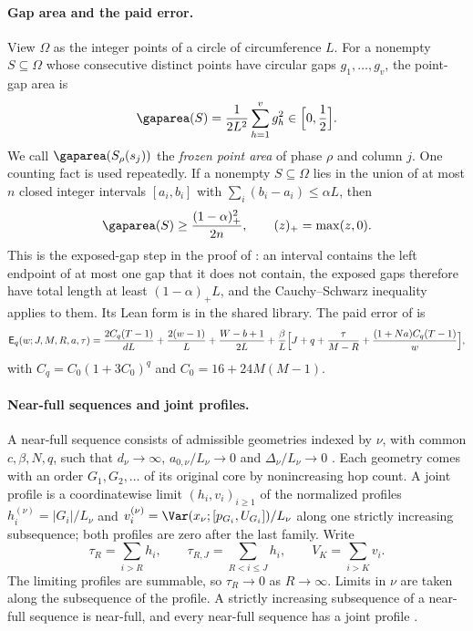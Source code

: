 \paragraph{Gap area and the paid error.}
View $\Omega$ as the integer points of a circle of circumference $L$. For a nonempty
$S\subseteq\Omega$ whose consecutive distinct points have circular gaps
$g_1,\dots,g_v$, the point-gap area is \cite[(2.14)]{SourceCovers2026}
\[
 \gaparea(S)=\frac1{2L^2}\sum_{h=1}^vg_h^2\in\Bigl[0,\frac12\Bigr].
\]
We call $\gaparea(S_\rho(s_j))$ the \emph{frozen point area} of phase $\rho$ and
column $j$. One counting fact is used repeatedly. If a nonempty $S\subseteq\Omega$
lies in the union of at most $n$ closed integer intervals $[a_i,b_i]$ with
$\sum_i(b_i-a_i)\le\alpha L$, then
\begin{equation}\label{eq:interval-budget}
 \gaparea(S)\ge\frac{(1-\alpha)_+^2}{2n},\qquad (z)_+=\max(z,0).
\end{equation}
This is the exposed-gap step in the proof of \cite[Lemma~3.3]{SourceCovers2026}:
an interval contains the left endpoint of at most one gap that it does not contain,
the exposed gaps therefore have total length at least $(1-\alpha)_+L$, and the
Cauchy--Schwarz inequality applies to them. Its Lean form is
 in the shared library.
The paid error of \cite[(3.7)]{SourceCovers2026} is
\[
 \mathsf E_q(w;J,M,R,a,\tau)=\frac{2C_q(T-1)}{dL}+\frac{2(w-1)}L+\frac{W-b+1}{2L}
 +\frac\beta L\Bigl[J+q+\frac\tau{M-R}+\frac{(1+Na)C_q(T-1)}w\Bigr],
\]
with $C_q=C_0(1+3C_0)^q$ and $C_0=16+24M(M-1)$.

\paragraph{Near-full sequences and joint profiles.}
A near-full sequence consists of admissible geometries indexed by $\nu$, with common
$c,\beta,N,q$, such that $d_\nu\to\infty$, $a_{0,\nu}/L_\nu\to0$ and
$\Delta_\nu/L_\nu\to0$ \cite[Definition~4.1]{SourceCovers2026}. Each geometry comes
with an order $G_1,G_2,\dots$ of its original core by nonincreasing hop count.
A joint profile is a coordinatewise limit $(h_i,v_i)_{i\ge1}$ of the normalized
profiles $h_i^{(\nu)}=|G_i|/L_\nu$ and $v_i^{(\nu)}=\Var(x_\nu;[p_{G_i},U_{G_i}])/L_\nu$
along one strictly increasing subsequence; both profiles are zero after the last
family. Write
\[
 \tau_R=\sum_{i>R}h_i,\qquad \tau_{R,J}=\sum_{R<i\le J}h_i,\qquad V_K=\sum_{i>K}v_i.
\]
The limiting profiles are summable, so $\tau_R\to0$ as $R\to\infty$. Limits in $\nu$
are taken along the subsequence of the profile. A strictly increasing subsequence of a
near-full sequence is near-full, and every near-full sequence has a joint profile
\cite[Section~4.1]{SourceCovers2026}.
